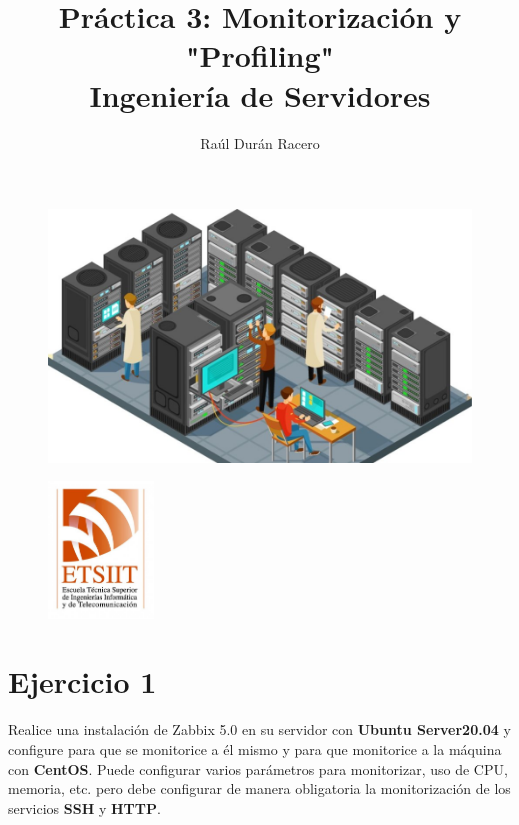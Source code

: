 \documentclass[a4paper]{article}
\begin{document}
\pagestyle{plain}
\title{Práctica 3: Monitorización y "Profiling" \\ 
Ingeniería de Servidores}
\author{Raúl Durán Racero}
\begin{figure}
    \centering
    \includegraphics[width=1.25\textwidth]{servers.pdf}
\end{figure}
\maketitle
\begin{figure}
    \centering
    \includegraphics[width=0.25\textwidth]{logoEtsiit.pdf}
\end{figure}

\newpage
\tableofcontents
\newpage
\section{Ejercicio 1}
Realice una instalación de Zabbix 5.0 en su servidor con \textbf{Ubuntu Server20.04} y configure
para que se monitorice a él mismo y para que monitorice a la máquina con \textbf{CentOS}.
Puede configurar varios parámetros para monitorizar, uso de CPU, memoria, etc. pero
debe configurar de manera obligatoria la monitorización de los servicios \textbf{SSH} y \textbf{HTTP}.
\end{document}
